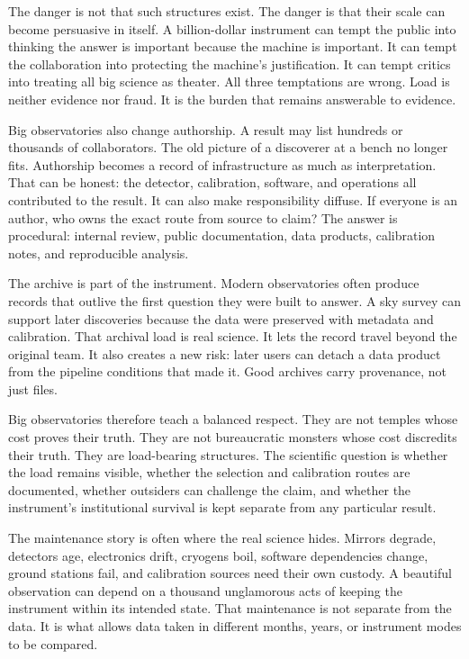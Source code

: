 The danger is not that such structures exist. The danger is that their scale
can become persuasive in itself. A billion-dollar instrument can tempt the
public into thinking the answer is important because the machine is
important. It can tempt the collaboration into protecting the machine's
justification. It can tempt critics into treating all big science as theater.
All three temptations are wrong. Load is neither evidence nor fraud. It is the
burden that remains answerable to evidence.

Big observatories also change authorship. A result may list hundreds or
thousands of collaborators. The old picture of a discoverer at a bench no
longer fits. Authorship becomes a record of infrastructure as much as
interpretation. That can be honest: the detector, calibration, software, and
operations all contributed to the result. It can also make responsibility
diffuse. If everyone is an author, who owns the exact route from source to
claim? The answer is procedural: internal review, public documentation,
data products, calibration notes, and reproducible analysis.

The archive is part of the instrument. Modern observatories often produce
records that outlive the first question they were built to answer. A sky
survey can support later discoveries because the data were preserved with
metadata and calibration. That archival load is real science. It lets the
record travel beyond the original team. It also creates a new risk: later
users can detach a data product from the pipeline conditions that made it.
Good archives carry provenance, not just files.

Big observatories therefore teach a balanced respect. They are not temples
whose cost proves their truth. They are not bureaucratic monsters whose cost
discredits their truth. They are load-bearing structures. The scientific
question is whether the load remains visible, whether the selection and
calibration routes are documented, whether outsiders can challenge the claim,
and whether the instrument's institutional survival is kept separate from any
particular result.

The maintenance story is often where the real science hides. Mirrors degrade,
detectors age, electronics drift, cryogens boil, software dependencies change,
ground stations fail, and calibration sources need their own custody. A
beautiful observation can depend on a thousand unglamorous acts of keeping the
instrument within its intended state. That maintenance is not separate from
the data. It is what allows data taken in different months, years, or
instrument modes to be compared.

